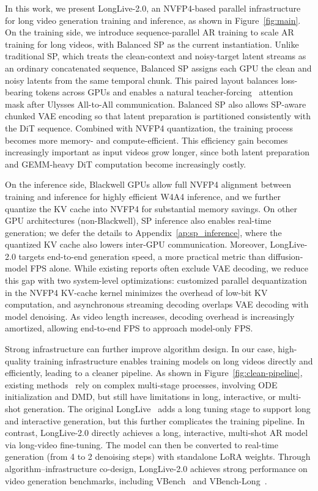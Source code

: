 \documentclass{llmxive}
\begin{document}
In this work, we present LongLive-2.0, an NVFP4-based parallel infrastructure for long video generation training and inference, as shown in Figure~\ref{fig:main}. 
On the training side, we introduce sequence-parallel AR training to scale AR training for long videos, with Balanced SP as the current instantiation. Unlike traditional SP, which treats the clean-context and noisy-target latent streams as an ordinary concatenated sequence, Balanced SP assigns each GPU the clean and noisy latents from the same temporal chunk. This paired layout balances loss-bearing tokens across GPUs and enables a natural teacher-forcing~\cite{zhou2025taming} attention mask after Ulysses All-to-All communication. Balanced SP also allows SP-aware chunked VAE encoding so that latent preparation is partitioned consistently with the DiT sequence. Combined with NVFP4 quantization, the training process becomes more memory- and compute-efficient. This efficiency gain becomes increasingly important as input videos grow longer, since both latent preparation and GEMM-heavy DiT computation become increasingly costly. 

On the inference side, Blackwell GPUs allow full NVFP4 alignment between training and inference for highly efficient W4A4 inference, and we further quantize the KV cache into NVFP4 for substantial memory savings. On other GPU architectures (non-Blackwell), SP inference also enables real-time generation; we defer the details to Appendix~\ref{ap:sp_inference}, where the quantized KV cache also lowers inter-GPU communication.
Moreover, LongLive-2.0 targets end-to-end generation speed, a more practical metric than diffusion-model FPS alone. While existing reports often exclude VAE decoding, we reduce this gap with two system-level optimizations: customized parallel dequantization in the NVFP4 KV-cache kernel minimizes the overhead of low-bit KV computation, and asynchronous streaming decoding overlaps VAE decoding with model denoising. As video length increases, decoding overhead is increasingly amortized, allowing end-to-end FPS to approach model-only FPS.


Strong infrastructure can further improve algorithm design. In our case, high-quality training infrastructure enables training models on long videos directly and efficiently, leading to a cleaner pipeline. As shown in Figure~\ref{fig:clean-pipeline}, existing methods~\cite{huang2025self, zhu2026causal} rely on complex multi-stage processes, involving ODE initialization and DMD, but still have limitations in long, interactive, or multi-shot generation. The original LongLive~\cite{yang2025longlive} adds a long tuning stage to support long and interactive generation, but this further complicates the training pipeline. In contrast, LongLive-2.0 directly achieves a long, interactive, multi-shot AR model via long-video fine-tuning. 
The model can then be converted to real-time generation (from 4 to 2 denoising steps) with standalone LoRA weights. Through algorithm–infrastructure co-design, LongLive-2.0 achieves strong performance on video generation benchmarks, including VBench~\cite{vbench} and VBench-Long~\cite{vbench-long}.
\end{document}
